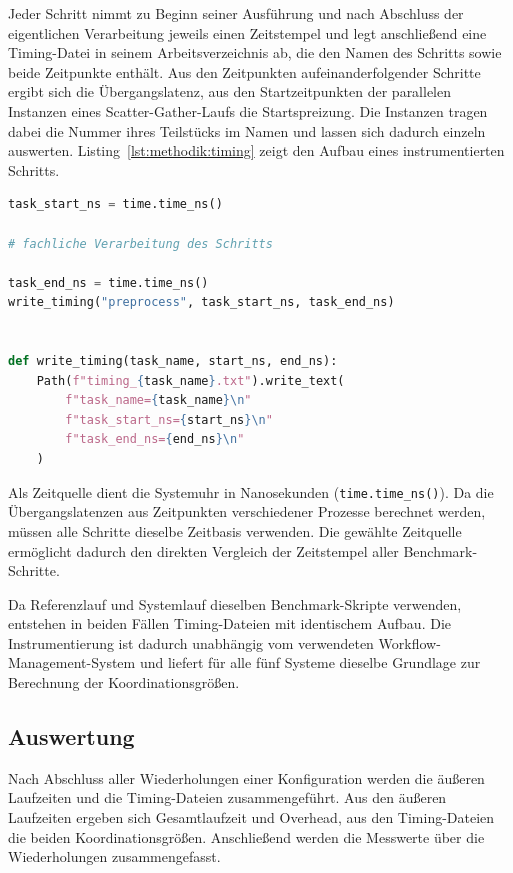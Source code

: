 Jeder Schritt nimmt zu Beginn seiner Ausführung und nach Abschluss
der eigentlichen Verarbeitung jeweils einen Zeitstempel und legt anschließend eine Timing-Datei
in seinem Arbeitsverzeichnis ab, die den Namen des Schritts sowie
beide Zeitpunkte enthält. Aus den Zeitpunkten aufeinanderfolgender
Schritte ergibt sich die Übergangslatenz, aus den Startzeitpunkten
der parallelen Instanzen eines Scatter-Gather-Laufs die
Startspreizung. Die Instanzen tragen dabei die Nummer ihres
Teilstücks im Namen und lassen sich dadurch einzeln auswerten.
Listing~\ref{lst:methodik:timing} zeigt den Aufbau eines
instrumentierten Schritts.

\begin{lstlisting}[language=Python,
  caption={Aufbau eines instrumentierten Benchmark-Schritts},
  label={lst:methodik:timing}]
task_start_ns = time.time_ns()

# fachliche Verarbeitung des Schritts

task_end_ns = time.time_ns()
write_timing("preprocess", task_start_ns, task_end_ns)


def write_timing(task_name, start_ns, end_ns):
    Path(f"timing_{task_name}.txt").write_text(
        f"task_name={task_name}\n"
        f"task_start_ns={start_ns}\n"
        f"task_end_ns={end_ns}\n"
    )
\end{lstlisting}

Als Zeitquelle dient die Systemuhr in Nanosekunden
(\texttt{time.time\_ns()}). Da die Übergangslatenzen aus
Zeitpunkten verschiedener Prozesse berechnet werden, müssen alle
Schritte dieselbe Zeitbasis verwenden. Die gewählte Zeitquelle
ermöglicht dadurch den direkten Vergleich der Zeitstempel aller
Benchmark-Schritte.

Da Referenzlauf und Systemlauf dieselben Benchmark-Skripte
verwenden, entstehen in beiden Fällen Timing-Dateien mit
identischem Aufbau. Die Instrumentierung ist dadurch unabhängig
vom verwendeten Workflow-Management-System und liefert für alle
fünf Systeme dieselbe Grundlage zur Berechnung der
Koordinationsgrößen.

\subsection{Auswertung}
\label{sec:methodik:auswertung}

Nach Abschluss aller Wiederholungen einer Konfiguration werden die
äußeren Laufzeiten und die Timing-Dateien zusammengeführt. Aus den
äußeren Laufzeiten ergeben sich Gesamtlaufzeit und Overhead, aus
den Timing-Dateien die beiden Koordinationsgrößen. Anschließend
werden die Messwerte über die Wiederholungen zusammengefasst.

